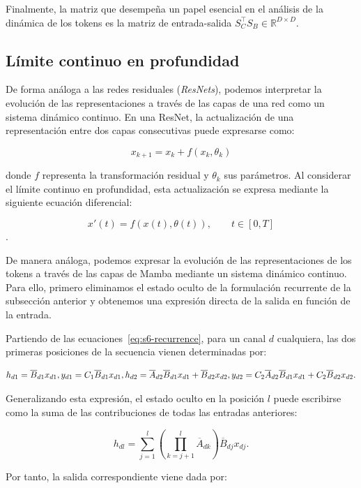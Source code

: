 Finalmente, la matriz que desempeña un papel esencial en el análisis de la dinámica de los tokens es la matriz 
de entrada-salida $S_C^\top S_B\in\mathbb{R}^{D\times D}$.

\subsection{Límite continuo en profundidad}
\label{sec:ssm-limite}

De forma análoga a las redes residuales (\textit{ResNets}), podemos interpretar la evolución de las 
representaciones a través de las capas de una red como un sistema dinámico continuo. En una ResNet, la
actualización de una representación entre dos capas consecutivas puede expresarse como:

\[
x_{k+1} = x_k + f(x_k, \theta_k)
\]

donde $f$ representa la transformación residual y $\theta_k$ sus parámetros. Al considerar el límite 
continuo en profundidad, esta actualización se expresa mediante la siguiente ecuación diferencial:

\[x'(t) = f(x(t), \theta(t)), \qquad t\in[0,T]\].

De manera análoga, podemos expresar la evolución de las representaciones de los tokens a través de las 
capas de Mamba mediante un sistema dinámico continuo. Para ello, primero eliminamos el estado oculto de 
la formulación recurrente de la subsección anterior y obtenemos una expresión directa de la salida en 
función de la entrada.

Partiendo de las ecuaciones~\ref{eq:s6-recurrence}, para un canal $d$ cualquiera, las dos primeras 
posiciones de la secuencia vienen determinadas por:

\[
h_{d1} = \overline{B}_{d1}x_{d1},\\
y_{d1} = C_1\overline{B}_{d1}x_{d1},\\[4pt]
h_{d2} = \overline{A}_{d2}\overline{B}_{d1}x_{d1} + \overline{B}_{d2}x_{d2},\\
y_{d2} = C_2\overline{A}_{d2}\overline{B}_{d1}x_{d1} + C_2\overline{B}_{d2}x_{d2}.
\]

Generalizando esta expresión, el estado oculto en la posición $l$ puede escribirse como la suma de las 
contribuciones de todas las entradas anteriores:

\[
h_{dl} = \sum_{j=1}^{l}\left(\prod_{k=j+1}^{l}\overline{A}_{dk}\right)\overline{B}_{dj}x_{dj}.
\]

Por tanto, la salida correspondiente viene dada por:

